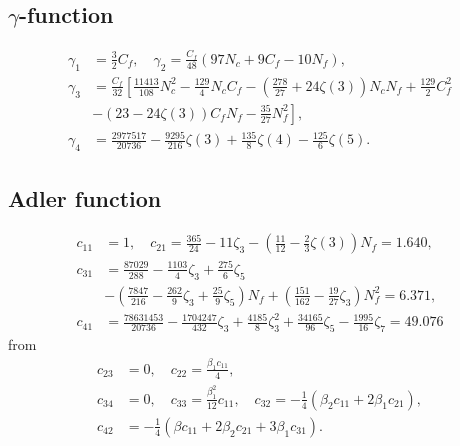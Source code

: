 \subsection{$\gamma$-function}
\begin{equation}
	\begin{split}
		\gamma_1 &= \frac{3}{2} C_f, \quad \gamma_2 = \frac{C_f}{48} (97 N_c + 9 C_f - 10 N_f), \\
		\gamma_3 &= \frac{C_f}{32} \left[\frac{11413}{108}N_c^2 - \frac{129}{4} N_c C_f - \left(\frac{278}{27} + 24 \zeta(3) \right) N_c N_f + \frac{129}{2} C_f^2 \right. \\
		&\left.- \left(23 - 24 \zeta(3)  \right) C_f N_f - \frac{35}{27}N_f^2\right], \\
		\gamma_4 &= \frac{2977517}{20736}-\frac{9295}{216}\zeta(3) + \frac{135}{8} \zeta(4) - \frac{125}{6}\zeta(5).
	\end{split}
\end{equation}	

\subsection{Adler function}
\begin{equation}
	\begin{split}
		c_{11} &= 1, \quad c_{21} = \frac{365}{24} - 11 \zeta_3 - \left(\frac{11}{12} - \frac{2}{3}\zeta(3) \right) N_f = 1.640, \\
		c_{31} &= \frac{87029}{288} - \frac{1103}{4} \zeta_3 + \frac{275}{6} \zeta_5 \\
		& - \left(\frac{7847}{216} - \frac{262}{9} \zeta_3 + \frac{25}{9}\zeta_5 \right) N_f + \left( \frac{151}{162} - \frac{19}{27} \zeta_3 \right) N_f^2 = 6.371, \\
		c_{41} &= \frac{78631453}{20736} - \frac{1704247}{432} \zeta_3 + \frac{4185}{8} \zeta_3^2 + \frac{34165}{96} \zeta_5 - \frac{1995}{16} \zeta_7 = 49.076
	\end{split}
\end{equation}
from \cite{Jamin2006}
\begin{equation}
	\begin{split}
		c_{23} &= 0, \quad c_{22} = \frac{\beta_1 c_{11}}{4}, \\
		c_{34} &= 0, \quad c_{33} = \frac{\beta_1^2}{12} c_{11}, \quad c_{32} = -\frac{1}{4}(\beta_2 c_{11} +  2 \beta_1 c_{21} ), \\
		c_{42} &= -\frac{1}{4} (\beta c_{11} + 2 \beta_2 c_{21} + 3 \beta_1 c_{31}).
	\end{split}
\end{equation}

